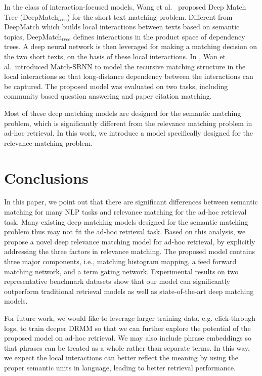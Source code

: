 \documentclass{sig-alternate-05-2015}
\begin{document}
In the class of interaction-focused models, Wang et al.~\cite{wang2015syntax} proposed Deep Match Tree (DeepMatch$_{tree}$) for the short text matching problem. Different from DeepMatch \cite{lu2013deep} which builds local interactions between texts based on semantic topics, DeepMatch$_{tree}$ defines interactions in the product space of dependency trees. A deep neural network is then leveraged for making a matching decision on the two short texts, on the basis of these local interactions. In \cite{wan2016match}, Wan et al.~introduced Match-SRNN to model the recursive matching structure in the local interactions so that long-distance dependency between the interactions can be captured. The proposed model was evaluated on two tasks, including community based question answering and paper citation \mbox{matching}.

Most of these deep matching models are designed for the semantic matching problem, which is significantly different from the relevance matching problem in ad-hoc retrieval. In this work, we introduce a model specifically designed for the relevance matching problem.

\section{Conclusions}
In this paper, we point out that there are significant differences between semantic matching for many NLP tasks and relevance matching for the ad-hoc retrieval task. Many existing deep matching models designed for the semantic matching problem thus may not fit the ad-hoc retrieval task. Based on this analysis, we propose a novel deep relevance matching model for ad-hoc retrieval, by explicitly addressing the three factors in relevance matching. The proposed model contains three major components, i.e., matching histogram mapping, a feed forward matching network, and a term gating network. Experimental results on two representative benchmark datasets show that our model can significantly outperform traditional retrieval models as well as state-of-the-art deep matching models.

For future work, we would like to leverage larger training data, e.g. click-through logs, to train deeper DRMM so that we can further explore the potential of the proposed model on ad-hoc retrieval. We may also include phrase embeddings so that phrases can be treated as a whole rather than separate terms. In this way, we expect the local interactions can better reflect the meaning by using the proper semantic units in language, leading to better retrieval performance.
\end{document}
